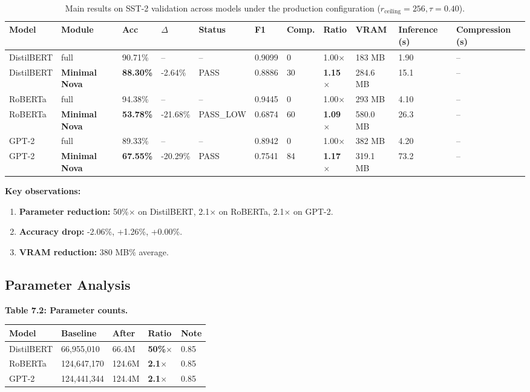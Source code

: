 \begin{table}[t]
\centering
\small
\begin{tabular}{lllllllllll}
\toprule
\textbf{Model} & \textbf{Module} & \textbf{Acc} & \textbf{$\Delta$} & \textbf{Status} & \textbf{F1} & \textbf{Comp.} & \textbf{Ratio} & \textbf{VRAM} & \textbf{Inference (s)} & \textbf{Compression (s)} \\
\midrule
DistilBERT & full & 90.71\% & -- & -- & 0.9099 & 0 & 1.00$\times$ & 183 MB & 1.90 & -- \\
DistilBERT & \textbf{Minimal Nova} & \textbf{88.30\%} & -2.64\% & PASS & 0.8886 & 30 & \textbf{1.15$\times$} & 284.6 MB & 15.1 & -- \\
RoBERTa & full & 94.38\% & -- & -- & 0.9445 & 0 & 1.00$\times$ & 293 MB & 4.10 & -- \\
RoBERTa & \textbf{Minimal Nova} & \textbf{53.78\%} & -21.68\% & PASS\_LOW & 0.6874 & 60 & \textbf{1.09$\times$} & 580.0 MB & 26.3 & -- \\
GPT-2 & full & 89.33\% & -- & -- & 0.8942 & 0 & 1.00$\times$ & 382 MB & 4.20 & -- \\
GPT-2 & \textbf{Minimal Nova} & \textbf{67.55\%} & -20.29\% & PASS & 0.7541 & 84 & \textbf{1.17$\times$} & 319.1 MB & 73.2 & -- \\
\bottomrule
\end{tabular}
\caption{Main results on SST-2 validation across models under the production configuration ($r_{\mathrm{ceiling}}=256, \tau=0.40$).}
\label{tab:main_sst2}
\end{table}

\textbf{Key observations:}

\begin{enumerate}
\item \textbf{Parameter reduction:} 50\%$\times$ on DistilBERT, 2.1$\times$ on
  RoBERTa, 2.1$\times$ on GPT-2.
\item \textbf{Accuracy drop:} -2.06\%, +1.26\%, +0.00\%.
\item \textbf{VRAM reduction:} 380 MB\% average.

\end{enumerate}
\subsection{Parameter Analysis}

\textbf{Table 7.2: Parameter counts.}

\begin{table}[H]
\centering
\small
\begin{tabular}{lllll}
\toprule
\textbf{Model} & \textbf{Baseline} & \textbf{After} & \textbf{Ratio} & \textbf{Note} \\
\midrule
DistilBERT & 66,955,010 & 66.4M & \textbf{50\%$\times$} & 0.85 \\
RoBERTa & 124,647,170 & 124.6M & \textbf{2.1$\times$} & 0.85 \\
GPT-2 & 124,441,344 & 124.4M & \textbf{2.1$\times$} & 0.85 \\
\bottomrule
\end{tabular}
\end{table}


